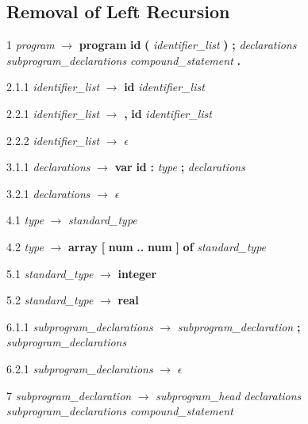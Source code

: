 
% 
\subsection*{Removal of Left Recursion}
1    \emph{program} $\rightarrow$ \textbf{program} \textbf{id} \textbf{(} \emph{identifier\_list} \textbf{)} \textbf{;} \emph{declarations} \emph{subprogram\_declarations} \emph{compound\_statement} \textbf{.}


2.1.1  \emph{identifier\_list} $\rightarrow$ \textbf{id} \emph{identifier_list\textprime}

2.2.1  \emph{identifier\_list\textprime} $\rightarrow$ \textbf{,} \textbf{id} \emph{identifier\_list\textprime}

2.2.2 \emph{identifier\_list\textprime} $\rightarrow$ $\epsilon$

3.1.1  \emph{declarations} $\rightarrow$ \textbf{var} \textbf{id} \textbf{:} \emph{type} \textbf{;} \emph{declarations}

3.2.1  \emph{declarations} $\rightarrow$ $\epsilon$

4.1  \emph{type} $\rightarrow$ \emph{standard\_type}

4.2  \emph{type} $\rightarrow$ \textbf{array} \textbf{[} \textbf{num} \textbf{..} \textbf{num} \textbf{]} \textbf{of} \emph{standard\_type}

5.1  \emph{standard\_type} $\rightarrow$ \textbf{integer}

5.2  \emph{standard\_type} $\rightarrow$ \textbf{real}

6.1.1  \emph{subprogram\_declarations} $\rightarrow$ \emph{subprogram\_declaration} \textbf{;} \emph{subprogram\_declarations}

6.2.1  \emph{subprogram\_declarations} $\rightarrow$ $\epsilon$

7    \emph{subprogram\_declaration} $\rightarrow$ \emph{subprogram\_head} \emph{declarations} \emph{subprogram\_declarations} \emph{compound\_statement}

